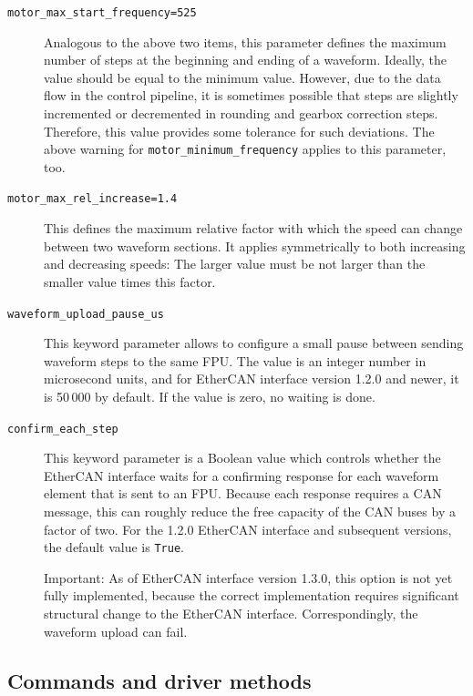 \documentclass[11pt,a4paper]{scrartcl}
\begin{document}
\begin{description}
\item[\texttt{motor\_max\_start\_frequency=525}] Analogous to the
  above two items, this parameter defines the maximum number of steps
  at the beginning and ending of a waveform.  Ideally, the value
  should be equal to the minimum value. However, due to the data flow
  in the control pipeline, it is sometimes possible that steps are
  slightly incremented or decremented in rounding and gearbox
  correction steps. Therefore, this value provides some tolerance for
  such deviations. The above warning for
  \texttt{motor\_minimum\_frequency} applies to this parameter, too.
  
\item[\texttt{motor\_max\_rel\_increase=1.4}] This defines the maximum
  relative factor with which the speed can change between two waveform
  sections. It applies symmetrically to both increasing and decreasing
  speeds: The larger value must be not larger than the smaller value
  times this factor.
  
\label{it:waveform_upload_pause_ms}
\item[\texttt{waveform\_upload\_pause\_us}] This keyword parameter
  allows to configure a small pause between sending waveform steps to
  the same FPU. The value is an integer number in microsecond units,
  and for EtherCAN interface version 1.2.0 and newer, it is 50\,000 by default. If
  the value is zero, no waiting is done.

\label{it:confirm_each_step}  
\item[\texttt{confirm\_each\_step}] This keyword parameter is a
  Boolean value which controls whether the EtherCAN interface waits for a
  confirming response for each waveform element that is sent to an
  FPU. Because each response requires a CAN message, this can roughly
  reduce the free capacity of the CAN buses by a factor of two. For the
  1.2.0 EtherCAN interface and subsequent versions, the default value is \texttt{True}.

  Important: As of EtherCAN interface version 1.3.0, this option is not yet fully
  implemented, because the correct implementation requires significant
  structural change to the EtherCAN interface. Correspondingly, the waveform
  upload can fail.
  
\end{description}


\subsection{Commands and driver methods}
\label{sec:commands}
\end{document}
